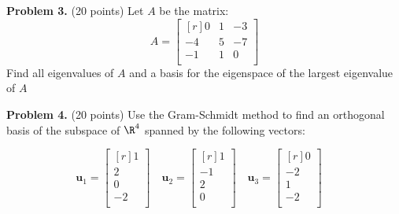 \documentclass[12pt]{article}
\begin{document}
\textbf{Problem 3.} (20 points) 
Let $A$ be the matrix:
\[A=
\begin{bmatrix*}[r]0&1&-3\\-4&5&-7\\-1&1&0\\\end{bmatrix*}
\]
Find all eigenvalues of $A$ and a basis for the eigenspace of the largest eigenvalue of $A$


\clearpage

\textbf{Problem 4.} (20 points)
Use the Gram-Schmidt method to find an orthogonal basis of the subspace 
of $\R^4$ spanned by the following vectors:

\[
\mathbf{u}_1=\begin{bmatrix*}[r]1\\ 2\\ 0\\ -2\\ \end{bmatrix*}\quad
\mathbf{u}_2=\begin{bmatrix*}[r]1\\ -1\\ 2\\ 0\\ \end{bmatrix*}\quad
\mathbf{u}_3=\begin{bmatrix*}[r]0\\ -2\\ 1\\ -2\\ \end{bmatrix*}\quad
\]

\end{document}

